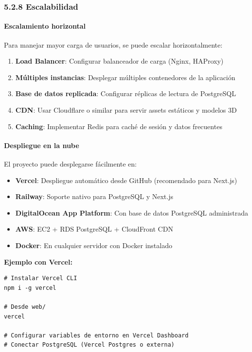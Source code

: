 \subsubsection{5.2.8 Escalabilidad}

\paragraph{Escalamiento horizontal}

Para manejar mayor carga de usuarios, se puede escalar horizontalmente:

\begin{enumerate}
	\item \textbf{Load Balancer}: Configurar balanceador de carga (Nginx, HAProxy)
	\item \textbf{Múltiples instancias}: Desplegar múltiples contenedores de la aplicación
	\item \textbf{Base de datos replicada}: Configurar réplicas de lectura de PostgreSQL
	\item \textbf{CDN}: Usar Cloudflare o similar para servir assets estáticos y modelos 3D
	\item \textbf{Caching}: Implementar Redis para caché de sesión y datos frecuentes
\end{enumerate}

\paragraph{Despliegue en la nube}

El proyecto puede desplegarse fácilmente en:

\begin{itemize}
	\item \textbf{Vercel}: Despliegue automático desde GitHub (recomendado para Next.js)
	\item \textbf{Railway}: Soporte nativo para PostgreSQL y Next.js
	\item \textbf{DigitalOcean App Platform}: Con base de datos PostgreSQL administrada
	\item \textbf{AWS}: EC2 + RDS PostgreSQL + CloudFront CDN
	\item \textbf{Docker}: En cualquier servidor con Docker instalado
\end{itemize}

\textbf{Ejemplo con Vercel:}

\begin{verbatim}
# Instalar Vercel CLI
npm i -g vercel

# Desde web/
vercel

# Configurar variables de entorno en Vercel Dashboard
# Conectar PostgreSQL (Vercel Postgres o externa)
\end{verbatim}
